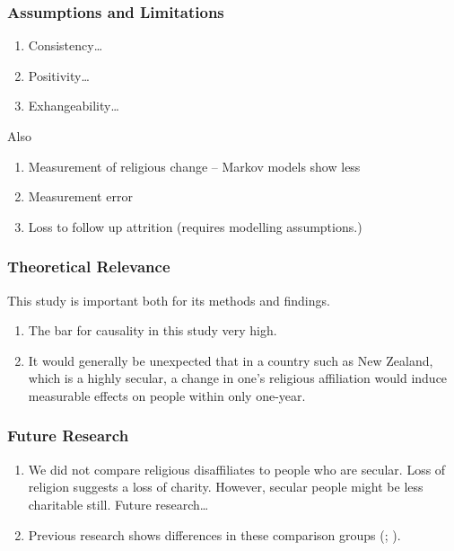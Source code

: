 \documentclass[
  singlecolumn,
  9pt]{article}
\providecommand{\tightlist}{%
  \setlength{\itemsep}{0pt}\setlength{\parskip}{0pt}}\usepackage{longtable,booktabs,array}
\begin{document}
\subsubsection{Assumptions and
Limitations}\label{assumptions-and-limitations}

\begin{enumerate}
\def\labelenumi{\arabic{enumi}.}
\tightlist
\item
  Consistency\ldots{}
\item
  Positivity\ldots{}
\item
  Exhangeability\ldots{}
\end{enumerate}

Also

\begin{enumerate}
\def\labelenumi{\arabic{enumi}.}
\tightlist
\item
  Measurement of religious change -- Markov models show less
\item
  Measurement error
\item
  Loss to follow up attrition (requires modelling assumptions.)
\end{enumerate}

\subsubsection{Theoretical Relevance}\label{theoretical-relevance}

This study is important both for its methods and findings.

\begin{enumerate}
\def\labelenumi{\arabic{enumi}.}
\tightlist
\item
  The bar for causality in this study very high.
\item
  It would generally be unexpected that in a country such as New
  Zealand, which is a highly secular, a change in one's religious
  affiliation would induce measurable effects on people within only
  one-year.
\end{enumerate}

\subsubsection{Future Research}\label{future-research}

\begin{enumerate}
\def\labelenumi{\arabic{enumi}.}
\tightlist
\item
  We did not compare religious disaffiliates to people who are secular.
  Loss of religion suggests a loss of charity. However, secular people
  might be less charitable still. Future research\ldots{}
\item
  Previous research shows differences in these comparison groups
  (;
  ).
\end{enumerate}
\end{document}
